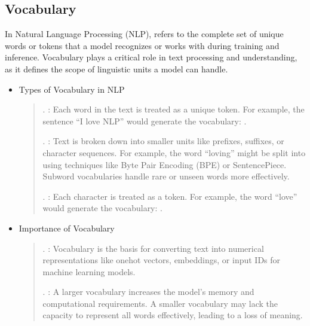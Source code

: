 \documentclass[letterpaper,11pt,english]{sphinxmanual}
\begin{document}
\subsection{Vocabulary}
\label{\detokenize{prelim:vocabulary}}
\sphinxAtStartPar
In Natural Language Processing (NLP),  refers to the complete set of unique words or tokens
that a model recognizes or works with during training and inference. Vocabulary plays a critical role in
text processing and understanding, as it defines the scope of linguistic units a model can handle.
\begin{itemize}
\item {} 
\sphinxAtStartPar
Types of Vocabulary in NLP
\begin{quote}

. :
\sphinxhyphen{} Each word in the text is treated as a unique token.
\sphinxhyphen{} For example, the sentence “I love NLP” would generate the vocabulary: .

. :
\sphinxhyphen{} Text is broken down into smaller units like prefixes, suffixes, or character sequences.
\sphinxhyphen{} For example, the word “loving” might be split into  using techniques like Byte Pair Encoding (BPE) or SentencePiece.
\sphinxhyphen{} Subword vocabularies handle rare or unseen words more effectively.

. :
\sphinxhyphen{} Each character is treated as a token.
\sphinxhyphen{} For example, the word “love” would generate the vocabulary: .
\end{quote}

\item {} 
\sphinxAtStartPar
Importance of Vocabulary
\begin{quote}

. :
\sphinxhyphen{} Vocabulary is the basis for converting text into numerical representations like one\sphinxhyphen{}hot vectors, embeddings, or input IDs for machine learning models.

. :
\sphinxhyphen{} A larger vocabulary increases the model’s memory and computational requirements.
\sphinxhyphen{} A smaller vocabulary may lack the capacity to represent all words effectively, leading to a loss of meaning.


\end{quote}
\end{itemize}
\end{document}
